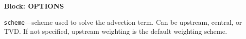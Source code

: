 
\item \textbf{Block: OPTIONS}

\begin{description}
\item \texttt{scheme}---scheme used to solve the advection term.  Can be upstream, central, or TVD.  If not specified, upstream weighting is the default weighting scheme.

\end{description}

